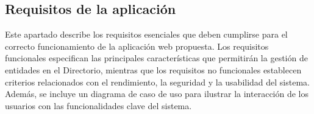 \subsection{Requisitos de la aplicación}

Este apartado describe los requisitos esenciales que deben cumplirse para el correcto funcionamiento de la aplicación web propuesta. Los requisitos funcionales especifican las principales características que permitirán la gestión de entidades en el Directorio, mientras que los requisitos no funcionales establecen criterios relacionados con el rendimiento, la seguridad y la usabilidad del sistema. Además, se incluye un diagrama de caso de uso para ilustrar la interacción de los usuarios con las funcionalidades clave del sistema.




